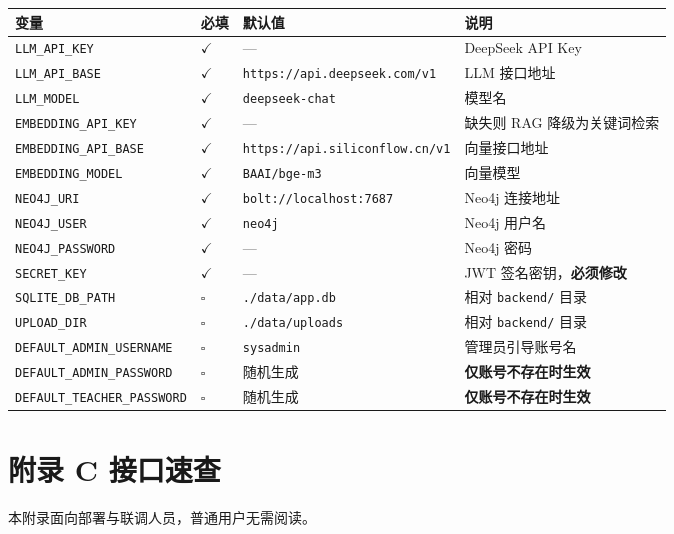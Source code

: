 \documentclass[UTF8,a4paper,11pt]{ctexrep}
\begin{document}
\begin{center}
\small
\begin{tabularx}{\linewidth}{@{}XXXX@{}}
\toprule
变量 & 必填 & 默认值 & 说明 \\
\midrule
\texttt{LLM\_API\_KEY} & $\checkmark$ & — & DeepSeek API Key \\
\texttt{LLM\_API\_BASE} & $\checkmark$ & \texttt{https://api.deepseek.com/v1} & LLM 接口地址 \\
\texttt{LLM\_MODEL} & $\checkmark$ & \texttt{deepseek-chat} & 模型名 \\
\texttt{EMBEDDING\_API\_KEY} & $\checkmark$ & — & 缺失则 RAG 降级为关键词检索 \\
\texttt{EMBEDDING\_API\_BASE} & $\checkmark$ & \texttt{https://api.siliconflow.cn/v1} & 向量接口地址 \\
\texttt{EMBEDDING\_MODEL} & $\checkmark$ & \texttt{BAAI/bge-m3} & 向量模型 \\
\texttt{NEO4J\_URI} & $\checkmark$ & \texttt{bolt://localhost:7687} & Neo4j 连接地址 \\
\texttt{NEO4J\_USER} & $\checkmark$ & \texttt{neo4j} & Neo4j 用户名 \\
\texttt{NEO4J\_PASSWORD} & $\checkmark$ & — & Neo4j 密码 \\
\texttt{SECRET\_KEY} & $\checkmark$ & — & JWT 签名密钥，\textbf{必须修改} \\
\texttt{SQLITE\_DB\_PATH} & $\square$ & \texttt{./data/app.db} & 相对 \texttt{backend/} 目录 \\
\texttt{UPLOAD\_DIR} & $\square$ & \texttt{./data/uploads} & 相对 \texttt{backend/} 目录 \\
\texttt{DEFAULT\_ADMIN\_USERNAME} & $\square$ & \texttt{sysadmin} & 管理员引导账号名 \\
\texttt{DEFAULT\_ADMIN\_PASSWORD} & $\square$ & 随机生成 & \textbf{仅账号不存在时生效} \\
\texttt{DEFAULT\_TEACHER\_PASSWORD} & $\square$ & 随机生成 & \textbf{仅账号不存在时生效} \\
\bottomrule
\end{tabularx}
\end{center}

\section*{附录 C 接口速查}

\begin{notebox}
本附录面向部署与联调人员，普通用户无需阅读。

\end{notebox}
\end{document}
